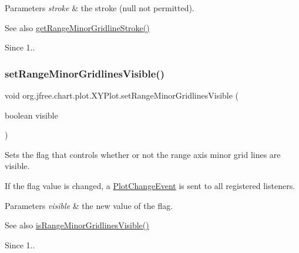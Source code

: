 \begin{DoxyParams}{Parameters}
{\em stroke} & the stroke ({\ttfamily null} not permitted).\\
\hline
\end{DoxyParams}
\begin{DoxySeeAlso}{See also}
\mbox{\hyperlink{classorg_1_1jfree_1_1chart_1_1plot_1_1_x_y_plot_afcd3a70c9771ea152f93518287e18319}{get\+Range\+Minor\+Gridline\+Stroke()}}
\end{DoxySeeAlso}
\begin{DoxySince}{Since}
1.. 
\end{DoxySince}
\mbox{\label{classorg_1_1jfree_1_1chart_1_1plot_1_1_x_y_plot_ae6bd0087340613ea30ea0a9d439cc9cc}} 
\subsubsection{\texorpdfstring{set\+Range\+Minor\+Gridlines\+Visible()}{setRangeMinorGridlinesVisible()}}
{\footnotesize\ttfamily void org.\+jfree.\+chart.\+plot.\+X\+Y\+Plot.\+set\+Range\+Minor\+Gridlines\+Visible (\begin{DoxyParamCaption}\item[{boolean}]{visible }\end{DoxyParamCaption})}

Sets the flag that controls whether or not the range axis minor grid lines are visible. 

If the flag value is changed, a \mbox{\hyperlink{}{Plot\+Change\+Event}} is sent to all registered listeners.


\begin{DoxyParams}{Parameters}
{\em visible} & the new value of the flag.\\
\hline
\end{DoxyParams}
\begin{DoxySeeAlso}{See also}
\mbox{\hyperlink{classorg_1_1jfree_1_1chart_1_1plot_1_1_x_y_plot_a114ea48062043f226940284401b8b4ec}{is\+Range\+Minor\+Gridlines\+Visible()}}
\end{DoxySeeAlso}
\begin{DoxySince}{Since}
1.. 
\end{DoxySince}
\mbox{\label{classorg_1_1jfree_1_1chart_1_1plot_1_1_x_y_plot_ae272233e713a6433a33b8cdd8db64c24}} 
